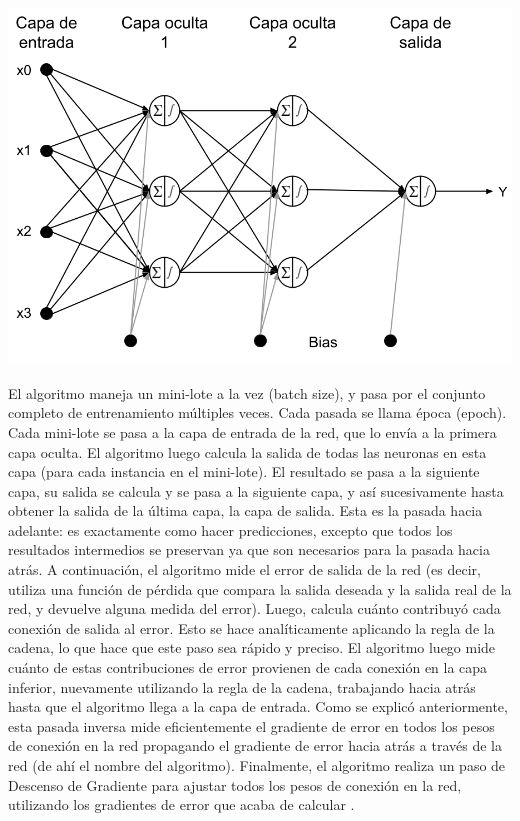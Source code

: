 \begin{minipage}{0.4\textwidth}
	\includegraphics[width=1.1\textwidth]{img/multicapa}
	\label{fig:mlp_architecture}
\end{minipage}

El algoritmo maneja un mini-lote a la vez (batch size), y pasa por el conjunto completo de entrenamiento múltiples veces. Cada pasada se llama época (epoch). Cada mini-lote se pasa a la capa de entrada de la red, que lo envía a la primera capa oculta. El algoritmo luego calcula la salida de todas las neuronas en esta capa (para cada instancia en el mini-lote). El resultado se pasa a la siguiente capa, su salida se calcula y se pasa a la siguiente capa, y así sucesivamente hasta obtener la salida de la última capa, la capa de salida. Esta es la pasada hacia adelante: es exactamente como hacer predicciones, excepto que todos los resultados intermedios se preservan ya que son necesarios para la pasada hacia atrás. A continuación, el algoritmo mide el error de salida de la red (es decir, utiliza una función de pérdida que compara la salida deseada y la salida real de la red, y devuelve alguna medida del error). Luego, calcula cuánto contribuyó cada conexión de salida al error. Esto se hace analíticamente aplicando la regla de la cadena, lo que hace que este paso sea rápido y preciso. El algoritmo luego mide cuánto de estas contribuciones de error provienen de cada conexión en la capa inferior, nuevamente utilizando la regla de la cadena, trabajando hacia atrás hasta que el algoritmo llega a la capa de entrada. Como se explicó anteriormente, esta pasada inversa mide eficientemente el gradiente de error en todos los pesos de conexión en la red propagando el gradiente de error hacia atrás a través de la red (de ahí el nombre del algoritmo). Finalmente, el algoritmo realiza un paso de Descenso de Gradiente para ajustar todos los pesos de conexión en la red, utilizando los gradientes de error que acaba de calcular \citep{geron2022hands}.

